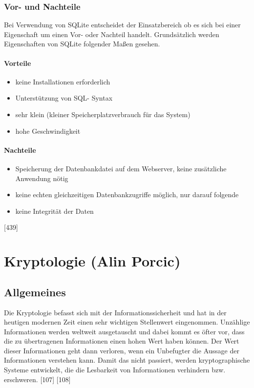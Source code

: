 \documentclass[12pt,a4paper]{report}
\begin{document}
\begin{onehalfspace}
\subsection{Vor- und Nachteile}
Bei Verwendung von SQLite entscheidet der Einsatzbereich ob es sich bei einer Eigenschaft um einen Vor- oder Nachteil handelt. Grundsätzlich werden Eigenschaften von SQLite folgender Maßen gesehen.
\subsubsection{Vorteile}
\begin{itemize}
\item keine Installationen erforderlich
\item Unterstützung von SQL- Syntax
\item sehr klein (kleiner Speicherplatzverbrauch für das System)
\item hohe Geschwindigkeit
\end{itemize}
\subsubsection{Nachteile}
\begin{itemize}
\item Speicherung der Datenbankdatei auf dem Webserver, keine zusätzliche Anwendung nötig
\item keine echten gleichzeitigen Datenbankzugriffe möglich, nur darauf folgende
\item keine Integrität der Daten
\end{itemize}
[439]

\chapter{Kryptologie (Alin Porcic)}\label{chap:krypto}
\section{Allgemeines}

Die Kryptologie befasst sich mit der Informationssicherheit und hat in der heutigen modernen Zeit einen sehr wichtigen Stellenwert eingenommen. Unzählige Informationen werden weltweit ausgetauscht und dabei kommt es öfter vor, dass die zu übertragenen Informationen einen hohen Wert haben können. Der Wert dieser Informationen geht dann verloren, wenn ein Unbefugter die Aussage der Informationen verstehen kann. Damit das nicht passiert, werden kryptographische Systeme entwickelt, die die Lesbarkeit von Informationen verhindern bzw. erschweren. [107] [108]\\


\end{onehalfspace}
\end{document}
